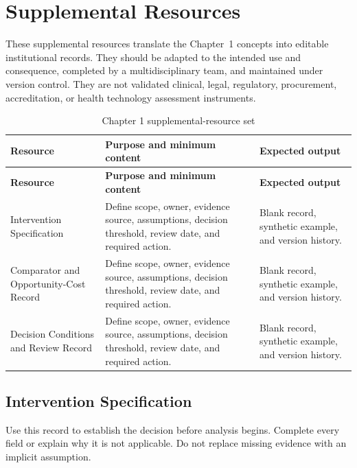 \section{Supplemental Resources}
\label{sec:comp-ch01-supplemental}

These supplemental resources translate the Chapter~1 concepts into editable
institutional records. They should be adapted to the intended use and consequence,
completed by a multidisciplinary team, and maintained under version control. They
are not validated clinical, legal, regulatory, procurement, accreditation, or health
technology assessment instruments.

\begin{longtable}{@{}p{}p{}p{}@{}}
\caption{Chapter 1 supplemental-resource set}
\label{tab:comp-ch01-supplemental-set}\\
\toprule
\textbf{Resource} & \textbf{Purpose and minimum content} & \textbf{Expected output} \\
\midrule
\endfirsthead
\toprule
\textbf{Resource} & \textbf{Purpose and minimum content} & \textbf{Expected output} \\
\midrule
\endhead
\bottomrule
\endlastfoot
Intervention Specification & Define scope, owner, evidence source, assumptions, decision threshold, review date, and required action. & Blank record, synthetic example, and version history. \\
Comparator and Opportunity-Cost Record & Define scope, owner, evidence source, assumptions, decision threshold, review date, and required action. & Blank record, synthetic example, and version history. \\
Decision Conditions and Review Record & Define scope, owner, evidence source, assumptions, decision threshold, review date, and required action. & Blank record, synthetic example, and version history. \\
\end{longtable}

\subsection{Intervention Specification}
\label{sec:comp-ch01-supp-1}
Use this record to establish the decision before analysis begins. Complete every
field or explain why it is not applicable. Do not replace missing evidence with an
implicit assumption.

